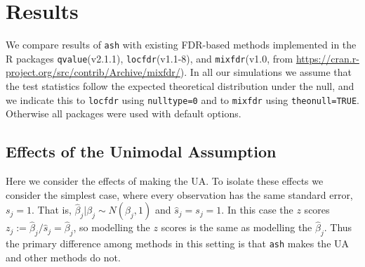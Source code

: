 \documentclass[11pt]{article}
\def\bhat{\hat{\beta}}
\def\shat{\hat{s}}
\def\qvalue{{\tt qvalue}\xspace}
\def\locfdr{{\tt locfdr}\xspace}
\def\mixfdr{{\tt mixfdr}\xspace}
\def\ash{{\tt ash}\xspace}
\begin{document}





\section*{Results}

We compare results of \ash with existing FDR-based methods implemented
in the R packages \qvalue (v2.1.1), \locfdr (v1.1-8), and \mixfdr (v1.0, from \url{https://cran.r-project.org/src/contrib/Archive/mixfdr/}).
In all our simulations we assume that the test statistics follow the expected theoretical distribution under the null, and we indicate this
to \locfdr using {\tt nulltype=0} and to \mixfdr using {\tt theonull=TRUE}. Otherwise all packages were used with default options.


\subsection*{Effects of the Unimodal Assumption}

Here we consider the effects of making the UA. 
To isolate these effects we consider the simplest case, where every observation has the same
standard error, $s_j=1$. That is,
$\bhat_j | \beta_j \sim N(\beta_j,1)$ and $\shat_j=s_j=1$. In this case the $z$ scores $z_j:=\bhat_j/\shat_j=\bhat_j$, so modelling the $z$ scores is the same as modelling the $\bhat_j$. Thus the primary difference among methods in this setting is that \ash makes the UA and other methods do not.
\end{document}
